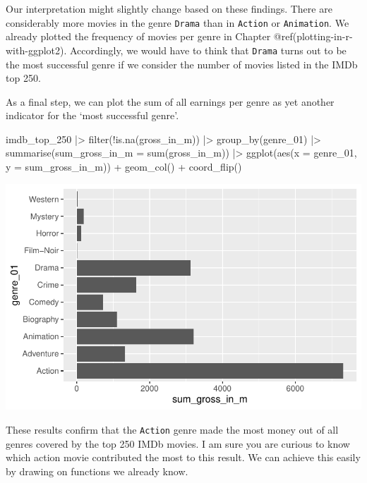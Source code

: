\documentclass[
  letterpaper,
]{krantz}
\makeatletter
\newenvironment{Shaded}{\begin{snugshade}}{\end{snugshade}}
\newcommand{\AttributeTok}[1]{\textcolor[rgb]{0.40,0.45,0.13}{#1}}
\newcommand{\FunctionTok}[1]{\textcolor[rgb]{0.28,0.35,0.67}{#1}}
\newcommand{\NormalTok}[1]{\textcolor[rgb]{0.00,0.23,0.31}{#1}}
\newcommand{\SpecialCharTok}[1]{\textcolor[rgb]{0.37,0.37,0.37}{#1}}
\newenvironment{kframe}{%
\medskip{}
\setlength{\fboxsep}{.8em}
 \def\at@end@of@kframe{}%
 \ifinner\ifhmode%
  \def\at@end@of@kframe{\end{minipage}}%
  \begin{minipage}{\columnwidth}%
 \fi\fi%
 \def\FrameCommand##1{\hskip\@totalleftmargin \hskip-\fboxsep
 \colorbox{shadecolor}{##1}\hskip-\fboxsep
     \hskip-\linewidth \hskip-\@totalleftmargin \hskip\columnwidth}%
 \MakeFramed {\advance\hsize-\width
   \@totalleftmargin\z@ \linewidth\hsize
   \@setminipage}}%
 {\par\unskip\endMakeFramed%
 \at@end@of@kframe}
\renewenvironment{Shaded}{\begin{kframe}}{\end{kframe}}
\makeatother
\begin{document}
Our interpretation might slightly change based on these findings. There
are considerably more movies in the genre \texttt{Drama} than in
\texttt{Action} or \texttt{Animation}. We already plotted the frequency
of movies per genre in Chapter @ref(plotting-in-r-with-ggplot2).
Accordingly, we would have to think that \texttt{Drama} turns out to be
the most successful genre if we consider the number of movies listed in
the IMDb top 250.

As a final step, we can plot the sum of all earnings per genre as yet
another indicator for the `most successful genre'.

\begin{Shaded}
\begin{Highlighting}[]
\NormalTok{imdb\_top\_250 }\SpecialCharTok{|\textgreater{}}
  \FunctionTok{filter}\NormalTok{(}\SpecialCharTok{!}\FunctionTok{is.na}\NormalTok{(gross\_in\_m)) }\SpecialCharTok{|\textgreater{}}
  \FunctionTok{group\_by}\NormalTok{(genre\_01) }\SpecialCharTok{|\textgreater{}}
  \FunctionTok{summarise}\NormalTok{(}\AttributeTok{sum\_gross\_in\_m =} \FunctionTok{sum}\NormalTok{(gross\_in\_m)) }\SpecialCharTok{|\textgreater{}}
  \FunctionTok{ggplot}\NormalTok{(}\FunctionTok{aes}\NormalTok{(}\AttributeTok{x =}\NormalTok{ genre\_01, }\AttributeTok{y =}\NormalTok{ sum\_gross\_in\_m)) }\SpecialCharTok{+}
  \FunctionTok{geom\_col}\NormalTok{() }\SpecialCharTok{+}
  \FunctionTok{coord\_flip}\NormalTok{()}
\end{Highlighting}
\end{Shaded}

\includegraphics{08_descriptive_statistics_files/figure-pdf/sum-earnings-per-genre-1.pdf}

These results confirm that the \texttt{Action} genre made the most money
out of all genres covered by the top 250 IMDb movies. I am sure you are
curious to know which action movie contributed the most to this result.
We can achieve this easily by drawing on functions we already know.
\end{document}
